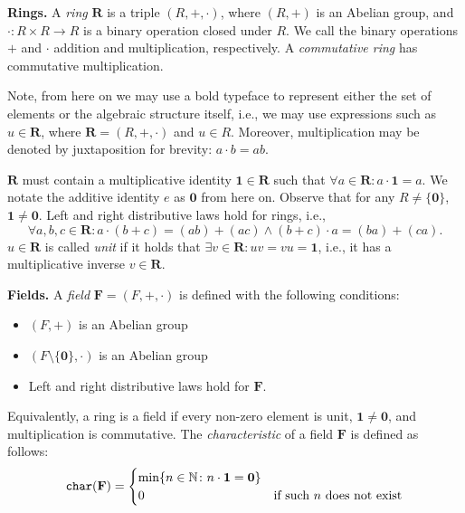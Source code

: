 \textbf{Rings.} A \emph{ring} $\mathbf R$ is a triple $(R,+,\cdot)$, 
where $(R, +)$ is an Abelian group, and $\cdot \colon R \times R \to R$ 
is a binary operation closed under $R$. We call the binary operations $+$ and $\cdot$ 
addition and multiplication, respectively. A \emph{commutative ring} has commutative multiplication. 

Note, from here on we may use a bold typeface to represent either the set of elements 
or the algebraic structure itself, i.e., 
we may use expressions such as $u \in \mathbf{R}$, where $\mathbf{R} = (R,+,\cdot)$ and $u \in R$. 
Moreover, multiplication may be denoted by juxtaposition for brevity: $a\cdot b = ab$. 

$\mathbf{R}$ must contain a multiplicative identity 
$\mathbf{1} \in \mathbf{R}$ such that $\forall a \in \mathbf{R} \colon a \cdot \mathbf{1} = a$. 
We notate the additive identity $e$ 
as $\mathbf{0}$ from here on. 
Observe that for any $R \neq \{\mathbf{0}\}$, $\mathbf{1} \neq \mathbf{0}$. 
Left and right distributive laws hold for rings, i.e., 
\[
  \forall a, b, c \in \mathbf{R} \colon a \cdot (b + c) = (ab) + (ac) \land (b + c) \cdot a = (ba) + (ca).
\]
$u \in \mathbf{R}$ is called \emph{unit} if it holds 
that $\exists v \in \mathbf{R} \colon uv = vu = \mathbf{1}$, 
i.e., it has a multiplicative inverse $v \in \mathbf{R}$.

\textbf{Fields.} A \emph{field} $\mathbf{F} = (F, +, \cdot)$ is defined with the following conditions:
\begin{itemize}
  \item $(F, +)$ is an Abelian group
  \item $(F\setminus \{\mathbf{0}\}, \cdot )$ is an Abelian group
  \item Left and right distributive laws hold for $\mathbf{F}$.
\end{itemize}

Equivalently, a ring is a field if every non-zero element is unit, $\mathbf{1} \neq \mathbf{0}$, 
and multiplication is commutative. 
The \emph{characteristic} of a field $\mathbf{F}$ is defined as follows:
\begin{equation}
  \texttt{char}(\mathbf{F}) =
    \begin{cases}
      \min\{n \in \mathbb N \colon n \cdot \mathbf{1} = \mathbf{0} \}\\
      0 & \text{if such $n$ does not exist}\\
    \end{cases}       
\end{equation}

